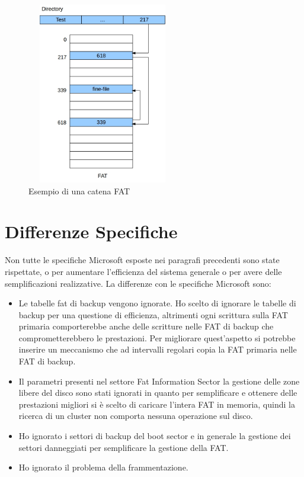 \begin{figure}[h]
 \centering
 \includegraphics[width=250px,height=300px]{./Immagini/fat.jpg}
 \caption{Esempio di una catena FAT}
 \label{Fig.:FAT}
\end{figure}


    \section{Differenze Specifiche}
     Non tutte le specifiche Microsoft esposte nei paragrafi precedenti sono state rispettate, o per aumentare l'efficienza del sistema generale o per avere delle semplificazioni realizzative. 
     La differenze con le specifiche Microsoft sono: 
    
     \begin{itemize}
    
     \item Le tabelle fat di backup vengono ignorate. Ho scelto di ignorare le tabelle di backup per una questione di efficienza, altrimenti ogni scrittura sulla  FAT primaria comporterebbe anche delle scritture 
     nelle FAT di backup che comprometterebbero le prestazioni. Per migliorare quest'aspetto si potrebbe inserire un meccanismo che ad intervalli regolari copia la FAT  primaria nelle FAT di backup.\\
 
     \item Il parametri presenti nel settore Fat Information Sector  la gestione delle zone libere del disco sono stati ignorati in quanto per semplificare e ottenere delle prestazioni migliori si è scelto di caricare l'intera FAT in memoria, quindi la ricerca di un cluster non comporta nessuna operazione sul disco.\\

     \item Ho ignorato i settori di backup del boot sector e in generale la gestione dei settori danneggiati per semplificare la gestione della FAT.\\

     \item Ho ignorato il problema della frammentazione. \\

       
     \end{itemize}
